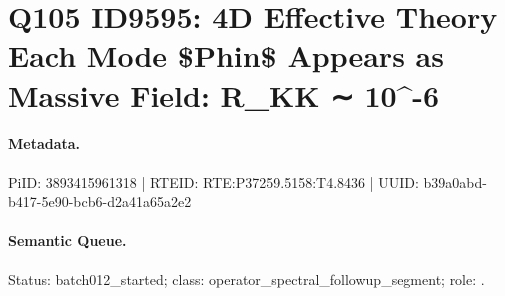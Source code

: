 \section*{Q105 ID9595: 4D Effective Theory Each Mode \$Phin\$ Appears as Massive Field: R\_KK ∼ 10\textasciicircum{}-6}
\paragraph{Metadata.}
PiID: 3893415961318 | RTEID: RTE:P37259.5158:T4.8436 | UUID: b39a0abd-b417-5e90-bcb6-d2a41a65a2e2

\paragraph{Semantic Queue.}
Status: batch012\_started; class: operator\_spectral\_followup\_segment; role: .

